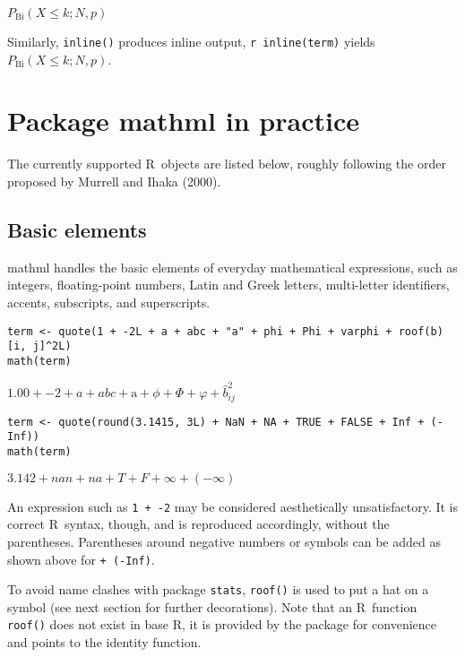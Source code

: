 \({P}_{\mathrm{Bi}}{\left({{X}{\le}{k}}{{;}{{N}{{,}{p}}}}\right)}\)

Similarly, \texttt{inline()} produces inline output, \texttt{r~inline(term)} yields
\({P}_{\mathrm{Bi}}{\left({{X}{\le}{k}}{{;}{{N}{{,}{p}}}}\right)}\).

\hypertarget{package-in-practice}{%
\section{Package mathml in practice}\label{package-in-practice}}

The currently supported R~objects are listed below, roughly following
the order proposed by Murrell and Ihaka (2000).

\hypertarget{basic-elements}{%
\subsection{Basic elements}\label{basic-elements}}

mathml handles the basic elements of everyday mathematical expressions,
such as integers, floating-point numbers, Latin and Greek letters,
multi-letter identifiers, accents, subscripts, and superscripts.

\begin{verbatim}
term <- quote(1 + -2L + a + abc + "a" + phi + Phi + varphi + roof(b)[i, j]^2L)
math(term)
\end{verbatim}

\({{{{{{{{1.00}{+}{{-}{2}}}{+}{a}}{+}{abc}}{+}{\mathrm{a}}}{+}{\phi}}{+}{\Phi}}{+}{\varphi}}{+}{{\hat{b}}_{{i}{{\mathrm{}}{j}}}^{2}}\)

\begin{verbatim}
term <- quote(round(3.1415, 3L) + NaN + NA + TRUE + FALSE + Inf + (-Inf))
math(term)
\end{verbatim}

\({{{{{{3.142}{+}{nan}}{+}{na}}{+}{T}}{+}{F}}{+}{\infty}}{+}{\left({-}{\infty}\right)}\)

An expression such as \texttt{1~+~-2} may be considered aesthetically
unsatisfactory. It is correct R~syntax, though, and is reproduced
accordingly, without the parentheses. Parentheses around negative
numbers or symbols can be added as shown above for \texttt{+~(-Inf)}.

To avoid name clashes with package \texttt{stats}, \texttt{roof()} is used to put a
hat on a symbol (see next section for further decorations). Note that an
R~function \texttt{roof()} does not exist in base R, it is provided by the
package for convenience and points to the identity function.

